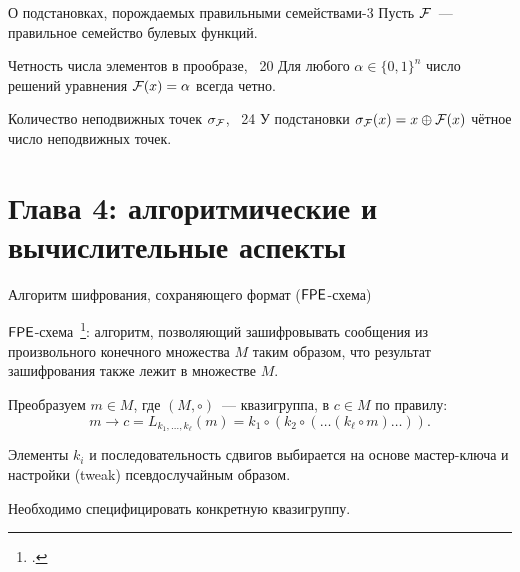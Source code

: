\begin{frame}{О подстановках, порождаемых правильными семействами-3}
    Пусть $\mathcal{F}$~--- правильное семейство булевых функций.
    \begin{mytheorem}{Четность числа элементов в прообразе, \thm~20}
    \label{thm:preimage}
        Для любого $\alpha \in \{0, 1\}^n$ число решений уравнения $\mathcal{F}(x) = \alpha$ всегда четно.
    \end{mytheorem}
    \pause
    \begin{mytheorem}{Количество неподвижных точек $\sigma_{\mathcal{F}}$, \thm~24}
        У подстановки $\sigma_{\mathcal{F}}(x) = x \oplus {\mathcal{F}}(x)$ чётное число неподвижных точек.
    \end{mytheorem}
\end{frame}


\section{Глава 4: алгоритмические и вычислительные аспекты}


\begin{frame}{Алгоритм шифрования, сохраняющего формат ($\mathsf{FPE}$-схема)}
    \begin{coloritemize}
        \item $\mathsf{FPE}$-схема~\footcite{bellare2009format}: алгоритм, позволяющий зашифровывать сообщения из произвольного конечного множества $M$ таким образом, что результат зашифрования также лежит в множестве $M$.
        \pause 
        \item Преобразуем $m \in M$, где $(M, \circ)$~--- квазигруппа, в $c \in M$ по правилу:
        \[
            m \to c = L_{k_1, \ldots, k_{\ell}}(m) = k_1 \circ \left( k_2 \circ ( \ldots ( k_{\ell} \circ m) \ldots ) \right).
        \]
        \pause 
        \item Элементы $k_i$ и последовательность сдвигов выбирается на основе мастер-ключа и настройки (tweak) псевдослучайным образом.
        \pause 
        \item Необходимо специфицировать конкретную квазигруппу.
    \end{coloritemize}
\end{frame}


